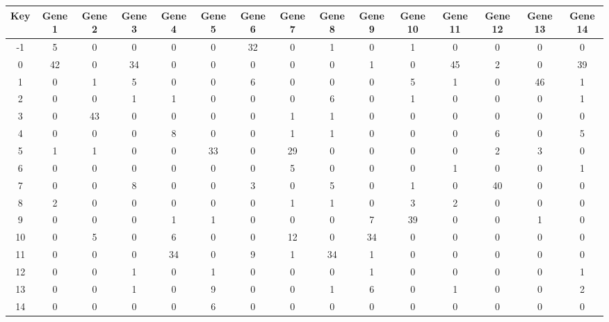 \begin{tabular}{|c|c|c|c|c|c|c|c|c|c|c|c|c|c|c|}
\hline
Key & Gene 1 & Gene 2 & Gene 3 & Gene 4 & Gene 5 & Gene 6 & Gene 7 & Gene 8 & Gene 9 & Gene 10 & Gene 11 & Gene 12 & Gene 13 & Gene 14 \\
\hline
-1 & 5 & 0 & 0 & 0 & 0 & 32 & 0 & 1 & 0 & 1 & 0 & 0 & 0 & 0 \\
0 & 42 & 0 & 34 & 0 & 0 & 0 & 0 & 0 & 1 & 0 & 45 & 2 & 0 & 39 \\
1 & 0 & 1 & 5 & 0 & 0 & 6 & 0 & 0 & 0 & 5 & 1 & 0 & 46 & 1 \\
2 & 0 & 0 & 1 & 1 & 0 & 0 & 0 & 6 & 0 & 1 & 0 & 0 & 0 & 1 \\
3 & 0 & 43 & 0 & 0 & 0 & 0 & 1 & 1 & 0 & 0 & 0 & 0 & 0 & 0 \\
4 & 0 & 0 & 0 & 8 & 0 & 0 & 1 & 1 & 0 & 0 & 0 & 6 & 0 & 5 \\
5 & 1 & 1 & 0 & 0 & 33 & 0 & 29 & 0 & 0 & 0 & 0 & 2 & 3 & 0 \\
6 & 0 & 0 & 0 & 0 & 0 & 0 & 5 & 0 & 0 & 0 & 1 & 0 & 0 & 1 \\
7 & 0 & 0 & 8 & 0 & 0 & 3 & 0 & 5 & 0 & 1 & 0 & 40 & 0 & 0 \\
8 & 2 & 0 & 0 & 0 & 0 & 0 & 1 & 1 & 0 & 3 & 2 & 0 & 0 & 0 \\
9 & 0 & 0 & 0 & 1 & 1 & 0 & 0 & 0 & 7 & 39 & 0 & 0 & 1 & 0 \\
10 & 0 & 5 & 0 & 6 & 0 & 0 & 12 & 0 & 34 & 0 & 0 & 0 & 0 & 0 \\
11 & 0 & 0 & 0 & 34 & 0 & 9 & 1 & 34 & 1 & 0 & 0 & 0 & 0 & 0 \\
12 & 0 & 0 & 1 & 0 & 1 & 0 & 0 & 0 & 1 & 0 & 0 & 0 & 0 & 1 \\
13 & 0 & 0 & 1 & 0 & 9 & 0 & 0 & 1 & 6 & 0 & 1 & 0 & 0 & 2 \\
14 & 0 & 0 & 0 & 0 & 6 & 0 & 0 & 0 & 0 & 0 & 0 & 0 & 0 & 0 \\
\hline
\end{tabular}